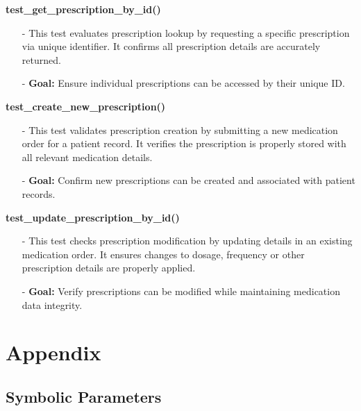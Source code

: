 \documentclass[12pt, titlepage]{article}
\begin{document}
\textbf{test\_get\_prescription\_by\_id()}
\begin{itemize}
    \item[-] This test evaluates prescription lookup by requesting a specific prescription via unique identifier. It confirms all prescription details are accurately returned.
    \item[-] \textbf{Goal:} Ensure individual prescriptions can be accessed by their unique ID.
\end{itemize}

\textbf{test\_create\_new\_prescription()}
\begin{itemize}
    \item[-] This test validates prescription creation by submitting a new medication order for a patient record. It verifies the prescription is properly stored with all relevant medication details.
    \item[-] \textbf{Goal:} Confirm new prescriptions can be created and associated with patient records.
\end{itemize}

\textbf{test\_update\_prescription\_by\_id()}
\begin{itemize}
    \item[-] This test checks prescription modification by updating details in an existing medication order. It ensures changes to dosage, frequency or other prescription details are properly applied.
    \item[-] \textbf{Goal:} Verify prescriptions can be modified while maintaining medication data integrity.
\end{itemize}







\newpage




\newpage

\section{Appendix}

\subsection{Symbolic Parameters}
\renewcommand{\arraystretch}{1.3}
\end{document}
